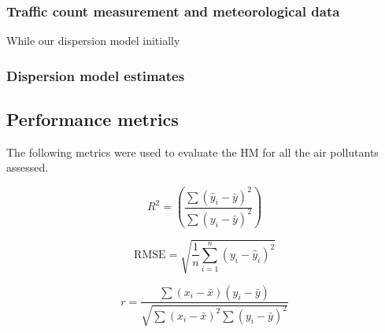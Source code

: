 \documentclass{article}
\begin{document}
\subsubsection{Traffic count measurement and meteorological data}
While our dispersion model initially 

\subsubsection{Dispersion model estimates}

\subsection{Performance metrics}
The following metrics were used to evaluate the HM for all the air pollutants assessed. 

\begin{equation}
R^2 = \left( \frac{\sum (\hat{y}_i - \bar{y})^2}{\sum (y_i - \bar{y})^2} \right)
\end{equation}

\begin{equation}
\text{RMSE} = \sqrt{\frac{1}{n} \sum_{i=1}^{n} (y_i - \hat{y}_i)^2}
\end{equation}

\begin{equation}
r = \frac{\sum (x_i - \bar{x})(y_i - \bar{y})}{\sqrt{\sum (x_i - \bar{x})^2 \sum (y_i - \bar{y})^2}}
\end{equation}
\vspace{0.5 cm}
\end{document}
